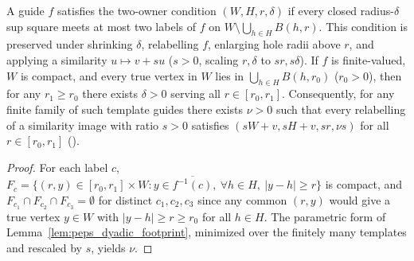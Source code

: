 \begin{lemma}
    \label{lem:peps_dyadic_footprint_uniform}
    \leanok
    A guide $f$ satisfies the two-owner condition $(W,H,r,\delta)$ if every closed
    radius-$\delta$ sup square meets at most two labels of $f$ on
    $W\setminus\bigcup_{h\in H}B(h,r)$. This condition is preserved under
    shrinking $\delta$, relabelling $f$, enlarging hole radii above $r$, and
    applying a similarity $u\mapsto v+su$ ($s>0$, scaling $r,\delta$ to
    $sr,s\delta$). If $f$ is finite-valued, $W$ is compact, and every true vertex
    in $W$ lies in $\bigcup_{h\in H}B(h,r_0)$ ($r_0>0$), then for any $r_1\ge r_0$
    there exists $\delta>0$ serving all $r\in[r_0,r_1]$. Consequently, for any
    finite family of such template guides there exists $\nu>0$ such that every
    relabelling of a similarity image with ratio $s>0$ satisfies
    $(sW+v,sH+v,sr,\nu s)$ for all $r\in[r_0,r_1]$
    (\cite[Section~7, lines 464--479]{OpenAI2026PolynomialPEPS}).
\end{lemma}

\begin{proof}\leanok
    For each label $c$,
    $F_c=\{(r,y)\in[r_0,r_1]\times W:y\in\overline{f^{-1}(c)},\ \forall h\in H,\ |y-h|\ge r\}$
    is compact, and $F_{c_1}\cap F_{c_2}\cap F_{c_3}=\emptyset$ for distinct
    $c_1,c_2,c_3$ since any common $(r,y)$ would give a true vertex $y\in W$ with
    $|y-h|\ge r\ge r_0$ for all $h\in H$. The parametric form of
    Lemma~\ref{lem:peps_dyadic_footprint}, minimized over the finitely many
    templates and rescaled by $s$, yields $\nu$.
\end{proof}

